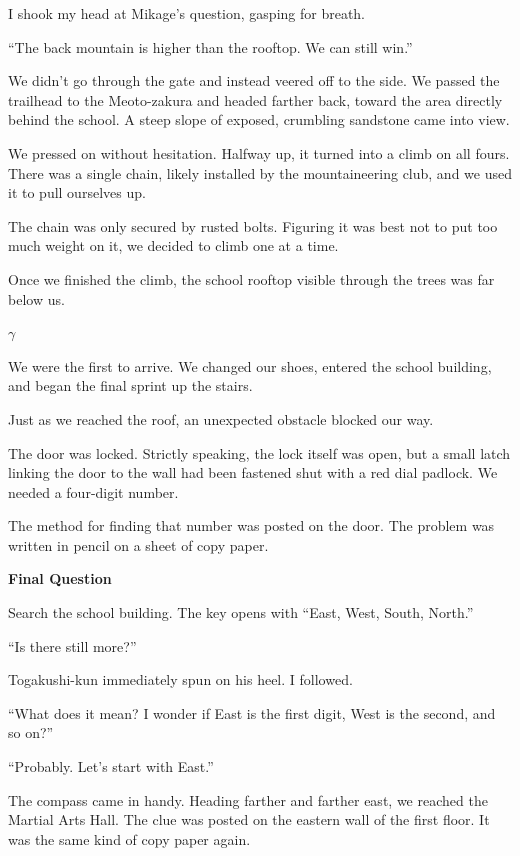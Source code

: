 \documentclass[
    a4paper,
    12pt,
    twoside,
    openany,
    UTF8,
    fontset=windows
]{ctexbook}
\begin{document}
I shook my head at Mikage's question, gasping for breath.

``The back mountain is higher than the rooftop. We can still win.''

We didn't go through the gate and instead veered off to the side. We passed the trailhead to the Meoto-zakura and headed farther back, toward the area directly behind the school. A steep slope of exposed, crumbling sandstone came into view.

We pressed on without hesitation. Halfway up, it turned into a climb on all fours. There was a single chain, likely installed by the mountaineering club, and we used it to pull ourselves up.

The chain was only secured by rusted bolts. Figuring it was best not to put too much weight on it, we decided to climb one at a time.

Once we finished the climb, the school rooftop visible through the trees was far below us.

$\gamma$

We were the first to arrive. We changed our shoes, entered the school building, and began the final sprint up the stairs.

Just as we reached the roof, an unexpected obstacle blocked our way.

The door was locked. Strictly speaking, the lock itself was open, but a small latch linking the door to the wall had been fastened shut with a red dial padlock. We needed a four-digit number.

The method for finding that number was posted on the door. The problem was written in pencil on a sheet of copy paper.

\begin{center}
\textbf{Final Question}

Search the school building. The key opens with ``East, West, South, North.''
\end{center}

``Is there still more?''

Togakushi-kun immediately spun on his heel. I followed.

``What does it mean? I wonder if East is the first digit, West is the second, and so on?''

``Probably. Let's start with East.''

The compass came in handy. Heading farther and farther east, we reached the Martial Arts Hall. The clue was posted on the eastern wall of the first floor. It was the same kind of copy paper again.
\end{document}
